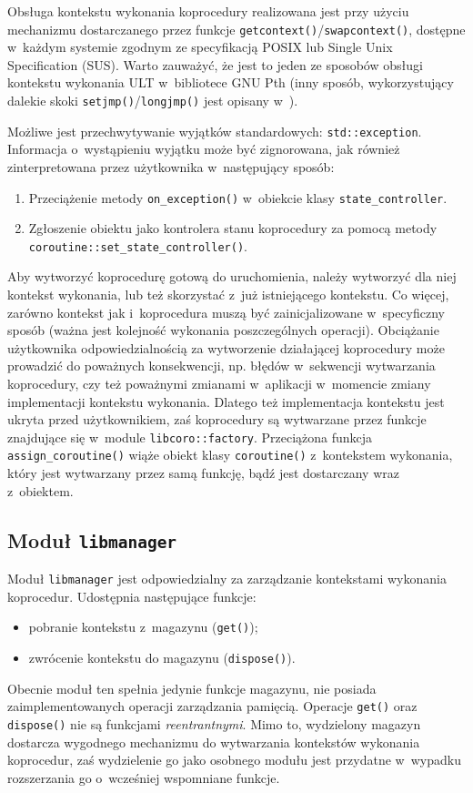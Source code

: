 \documentclass[12pt,makeidx]{mwart}
\newcommand{\code}{\texttt}
\newcommand{\dcolon}{::}
\newcommand{\procbr}{()}
\begin{document}
\par
%
\indent
	Obsługa kontekstu wykonania koprocedury realizowana jest przy użyciu mechanizmu dostarczanego przez funkcje
	\code{getcontext()}/\code{swapcontext()}, dostępne w~każdym systemie zgodnym ze specyfikacją POSIX lub Single Unix Specification (SUS).
	Warto zauważyć, że jest to jeden ze sposobów obsługi kontekstu wykonania
	ULT w~bibliotece GNU Pth (inny sposób, wykorzystujący dalekie skoki \code{setjmp\procbr}/\code{longjmp\procbr} jest opisany w~\cite{Engelschall}).
\par
%
\indent
	Możliwe jest przechwytywanie wyjątków standardowych: \code{std\dcolon exception}. Informacja o~wystąpieniu wyjątku może być zignorowana,
	jak również zinterpretowana przez użytkownika w~następujący sposób:
	\begin{enumerate}
		\item Przeciążenie metody \code{on\_exception\procbr} w~obiekcie klasy \code{state\_controller}.
		\item Zgłoszenie obiektu jako kontrolera stanu koprocedury za pomocą metody \code{coroutine\dcolon set\_state\_controller\procbr}.
	\end{enumerate}
\par
%
\indent
	Aby wytworzyć koprocedurę gotową do uruchomienia, należy wytworzyć dla niej kontekst wykonania, lub też skorzystać z~już istniejącego
	kontekstu. Co więcej, zarówno kontekst jak i~koprocedura muszą być zainicjalizowane w~specyficzny sposób (ważna jest kolejność wykonania
	poszczególnych operacji). Obciążanie użytkownika odpowiedzialnością za wytworzenie działającej koprocedury może prowadzić do poważnych
	konsekwencji, np. błędów w~sekwencji wytwarzania koprocedury, czy też poważnymi zmianami w~aplikacji w~momencie zmiany implementacji
	kontekstu wykonania. Dlatego też implementacja kontekstu jest ukryta przed użytkownikiem, zaś koprocedury są wytwarzane przez funkcje znajdujące
	się w~module \code{libcoro\dcolon factory}. Przeciążona funkcja \code{assign\_coroutine\procbr} wiąże obiekt klasy \code{coroutine\procbr}
	z~kontekstem wykonania, który jest wytwarzany przez samą funkcję, bądź jest dostarczany wraz z~obiektem.
\par
%
\subsection{Moduł \code{libmanager}}
\indent
	Moduł \code{libmanager} jest odpowiedzialny za zarządzanie kontekstami wykonania koprocedur. Udostępnia następujące funkcje:
	\begin{itemize}
		\item pobranie kontekstu z~magazynu (\code{get\procbr});
		\item zwrócenie kontekstu do magazynu (\code{dispose\procbr}).
	\end{itemize}
	Obecnie moduł ten spełnia jedynie funkcje magazynu, nie posiada zaimplementowanych operacji zarządzania pamięcią.
	Operacje \code{get\procbr} oraz \code{dispose\procbr} nie są funkcjami \emph{reentrantnymi}.
	Mimo to, wydzielony magazyn dostarcza wygodnego mechanizmu do wytwarzania kontekstów wykonania koprocedur, zaś wydzielenie
	go jako osobnego modułu jest przydatne w~wypadku rozszerzania go o~wcześniej wspomniane funkcje.
\par
%
\end{document}
